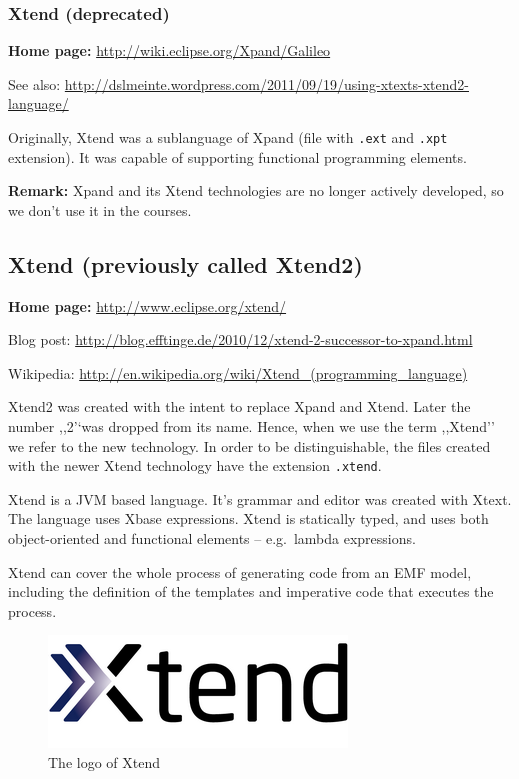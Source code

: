 \documentclass[]{report}
\let\Oldincludegraphics\includegraphics
\renewcommand{\includegraphics}[1]{
\begin{adjustbox}{max size={\textwidth}{\textheight}}
    \Oldincludegraphics[scale=0.6]{#1}%
\end{adjustbox}
}
\begin{document}
\subsubsection{Xtend (deprecated)}

\textbf{Home page:} \url{http://wiki.eclipse.org/Xpand/Galileo}

See also:
\url{http://dslmeinte.wordpress.com/2011/09/19/using-xtexts-xtend2-language/}

Originally, Xtend was a sublanguage of Xpand (file with \texttt{.ext}
and \texttt{.xpt} extension). It was capable of supporting functional
programming elements.

\textbf{Remark:} Xpand and its Xtend technologies are no longer actively
developed, so we don't use it in the courses.

\subsection{Xtend (previously called Xtend2)}

\textbf{Home page:} \url{http://www.eclipse.org/xtend/}

Blog post:
\url{http://blog.efftinge.de/2010/12/xtend-2-successor-to-xpand.html}

Wikipedia:
\url{http://en.wikipedia.org/wiki/Xtend_(programming_language)}

Xtend2 was created with the intent to replace Xpand and Xtend. Later the
number ,,2'`was dropped from its name. Hence, when we use the term
,,Xtend'' we refer to the new technology. In order to be
distinguishable, the files created with the newer Xtend technology have
the extension \texttt{.xtend}.

Xtend is a JVM based language. It's grammar and editor was created with
Xtext. The language uses Xbase expressions. Xtend is statically typed,
and uses both object-oriented and functional elements -- e.g.~lambda
expressions.

Xtend can cover the whole process of generating code from an EMF model,
including the definition of the templates and imperative code that
executes the process.

\begin{figure}[htbp]
\centering
\includegraphics{img/code_generation/xtend_logo.png}
\caption{The logo of Xtend}
\end{figure}
\end{document}
